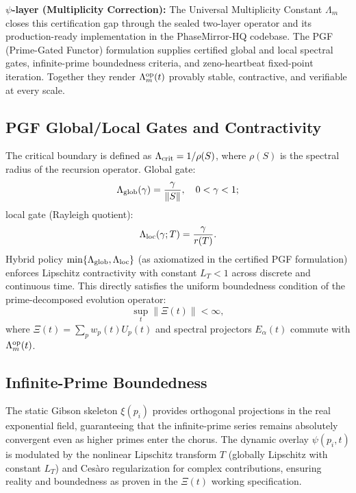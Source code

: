 \documentclass[11pt, a4paper]{article}
\begin{document}
\textbf{\(\psi\)-layer (Multiplicity Correction):}  
The Universal Multiplicity Constant \(\Lambda_m\) closes this certification gap through the sealed two-layer operator and its production-ready implementation in the PhaseMirror-HQ codebase. The PGF (Prime-Gated Functor) formulation supplies certified global and local spectral gates, infinite-prime boundedness criteria, and zeno-heartbeat fixed-point iteration. Together they render \(\Lambda_m^{\rm op}(t)\) provably stable, contractive, and verifiable at every scale.

\subsection{PGF Global/Local Gates and Contractivity}
The critical boundary is defined as \(\Lambda_{\rm crit} = 1/\rho(S)\), where \(\rho(S)\) is the spectral radius of the recursion operator. Global gate:
\[
\Lambda_{\rm glob}(\gamma) = \frac{\gamma}{\|S\|}, \quad 0 < \gamma < 1;
\]
local gate (Rayleigh quotient):
\[
\Lambda_{\rm loc}(\gamma; T) = \frac{\gamma}{r(T)}.
\]
Hybrid policy \(\min\{\Lambda_{\rm glob}, \Lambda_{\rm loc}\}\) (as axiomatized in the certified PGF formulation) enforces Lipschitz contractivity with constant \(L_T < 1\) across discrete and continuous time. This directly satisfies the uniform boundedness condition of the prime-decomposed evolution operator:
\[
\sup_t \|\Xi(t)\| < \infty,
\]
where \(\Xi(t) = \sum_p w_p(t) U_p(t)\) and spectral projectors \(E_\alpha(t)\) commute with \(\Lambda_m^{\rm op}(t)\).

\subsection{Infinite-Prime Boundedness}
The static Gibson skeleton \(\xi(p_i)\) provides orthogonal projections in the real exponential field, guaranteeing that the infinite-prime series remains absolutely convergent even as higher primes enter the chorus. The dynamic overlay \(\psi(p_i,t)\) is modulated by the nonlinear Lipschitz transform \(T\) (globally Lipschitz with constant \(L_T\)) and Cesàro regularization for complex contributions, ensuring reality and boundedness as proven in the \(\Xi(t)\) working specification.
\end{document}

